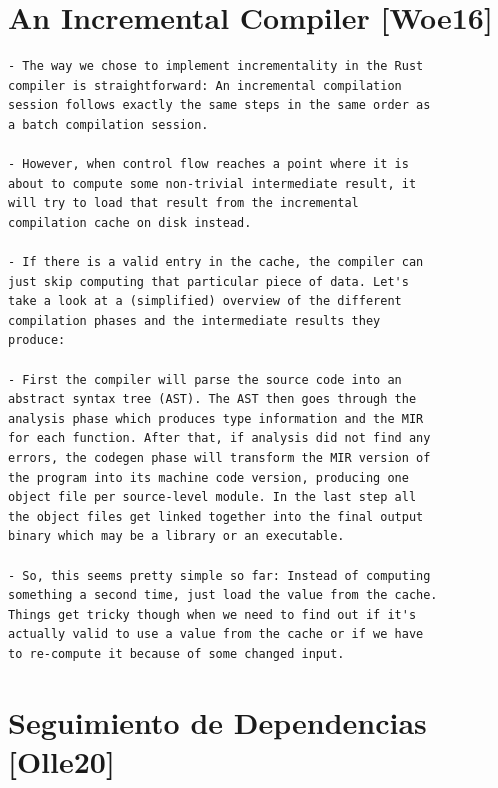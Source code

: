 \section*{An Incremental Compiler [Woe16]}

\begin{verbatim}
- The way we chose to implement incrementality in the Rust
compiler is straightforward: An incremental compilation
session follows exactly the same steps in the same order as
a batch compilation session.

- However, when control flow reaches a point where it is
about to compute some non-trivial intermediate result, it
will try to load that result from the incremental
compilation cache on disk instead.

- If there is a valid entry in the cache, the compiler can
just skip computing that particular piece of data. Let's
take a look at a (simplified) overview of the different
compilation phases and the intermediate results they
produce:

- First the compiler will parse the source code into an
abstract syntax tree (AST). The AST then goes through the
analysis phase which produces type information and the MIR
for each function. After that, if analysis did not find any
errors, the codegen phase will transform the MIR version of
the program into its machine code version, producing one
object file per source-level module. In the last step all
the object files get linked together into the final output
binary which may be a library or an executable.

- So, this seems pretty simple so far: Instead of computing
something a second time, just load the value from the cache.
Things get tricky though when we need to find out if it's
actually valid to use a value from the cache or if we have
to re-compute it because of some changed input.
\end{verbatim}
\cite{rust_blog_incremental_compilation}

\section*{Seguimiento de Dependencias [Olle20]}

